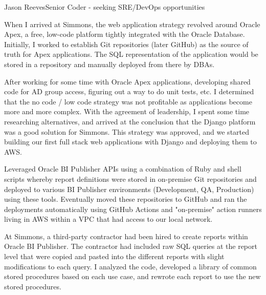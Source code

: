 \documentclass{article}
\begin{document}
\begin{cv}[avatar]{Jason Reeves}{Senior Coder - seeking SRE/DevOps opportunities}
\begin{cvevent}[2019]
    When I arrived at Simmons, the web application strategy revolved around Oracle Apex, a free, low-code platform tightly integrated with the Oracle Database.  Initially, I worked to establish Git repositories (later GitHub) as the source of truth for Apex applications.  The SQL representation of the application would be stored in a repository and manually deployed from there by DBAs.

    \vspace*{3mm}
    After working for some time with Oracle Apex applications, developing shared code for AD group access, figuring out a way to do unit tests, etc. I determined that the no code / low code strategy was not profitable as applications become more and more complex.  With the agreement of leadership, I spent some time researching alternatives, and arrived at the conclusion that the Django platform was a good solution for Simmons.  This strategy was approved, and we started building our first full stack web applications with Django and deploying them to AWS.
\end{cvevent}

\begin{cvevent}[2018-2020]
    Leveraged Oracle BI Publisher APIs using a combination of Ruby and shell scripts whereby report definitions were stored in on-premise Git repositories and deployed to various BI Publisher environments (Development, QA, Production) using these tools.  Eventually moved these repositories to GitHub and ran the deployments automatically using GitHub Actions and "on-premise" action runners living in AWS within a VPC that had access to our local network.  
    \vspace*{5mm}
\end{cvevent}

\begin{cvevent}[2018-2020]
    At Simmons, a third-party contractor had been hired to create reports within Oracle BI Publisher.  The contractor had included raw SQL queries at the report level that were copied and pasted into the different reports with slight modifications to each query.  I analyzed the code, developed a library of common stored procedures based on each use case, and rewrote each report to use the new stored procedures.


\end{cvevent}
\end{cv}
\end{document}
